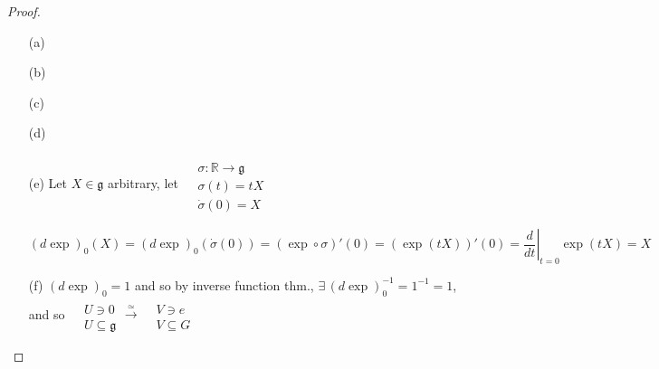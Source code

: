 \begin{proof}
\begin{enumerate}
\item[(a)]
\item[(b)]
\item[(c)]
\item[(d)]
\item[(e)] Let $X\in \mathfrak{g}$ arbitrary, let $\begin{aligned} & \quad \\ 
  & \sigma: \mathbb{R} \to \mathfrak{g} \\
  & \sigma(t) = tX \\
  & \dot{\sigma}(0) = X \end{aligned}$





\[
(d\exp )_0(X) = (d\exp )_0(\dot{\sigma}(0)) = (\exp \circ \sigma)'(0) = (\exp{ (tX)})'(0) = \left. \frac{d}{dt} \right|_{t=0} \exp{ (tX)}= X
\]
\item[(f)] $(d\exp )_0 =1$ and so by inverse function thm., $\exists \, (d\exp)_0^{-1}=1^{-1}=1$, and so $\begin{aligned} & \quad \\
  & U \ni 0 \\
  & U \subseteq \mathfrak{g} \end{aligned} \xrightarrow{ \simeq } \begin{aligned} & \quad \\ 
  & V \ni e \\
  & V \subseteq G \end{aligned}$
\end{enumerate}









\end{proof}
